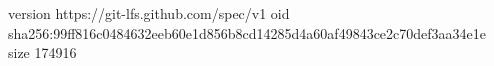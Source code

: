 version https://git-lfs.github.com/spec/v1
oid sha256:99ff816c0484632eeb60e1d856b8cd14285d4a60af49843ce2c70def3aa34e1e
size 174916
